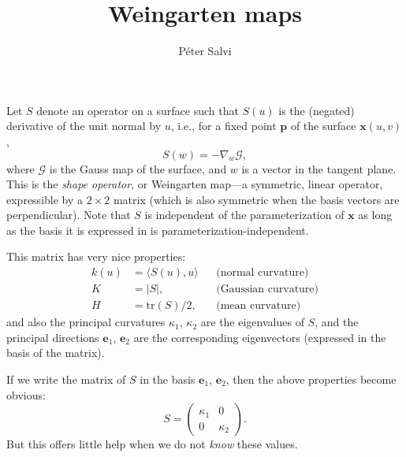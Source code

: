 \documentclass[a4paper]{article}
\begin{document}
\title{Weingarten maps}
\author{P\'eter Salvi}
\maketitle

Let $S$ denote an operator on a surface such that $S(u)$ is the
(negated) derivative of the unit normal by $u$, i.e., for a fixed
point $\mathbf{p}$ of the surface $\mathbf{x}(u,v)$,
\[S(w)=-\nabla_w\mathcal{G},\]
where $\mathcal{G}$ is the Gauss map of the surface, and $w$ is a
vector in the tangent plane. This is the \emph{shape operator}, or
Weingarten map---a symmetric, linear operator, expressible by a
$2\times2$ matrix (which is also symmetric when the basis vectors are
perpendicular). Note that $S$ is independent of the parameterization
of $\mathbf{x}$ as long as the basis it is expressed in is
parameterization-independent.

This matrix has very nice properties:
\begin{align*}
  k(u)&=\langle S(u),u\rangle&&\text{(normal curvature)}\\
  K&=|S|,&&\text{(Gaussian curvature)}\\
  H&=\mathrm{tr}(S)/2,&&\text{(mean curvature)}
\end{align*}
and also the principal curvatures $\kappa_1$, $\kappa_2$ are the
eigenvalues of $S$, and the principal directions $\mathbf{e}_1$,
$\mathbf{e}_2$ are the corresponding eigenvectors (expressed in the
basis of the matrix).

If we write the matrix of $S$ in the basis $\mathbf{e}_1$,
$\mathbf{e}_2$, then the above properties become obvious:
\begin{equation}
  S=
  \begin{pmatrix}
    \kappa_1 & 0 \\
    0 & \kappa_2
  \end{pmatrix}.
  \label{eq:S}
\end{equation}
But this offers little help when we do not \emph{know} these values.
\end{document}
